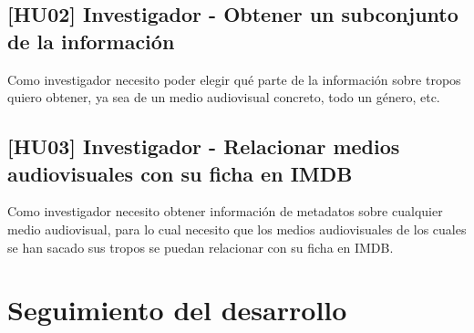 \subsection{[HU02] Investigador - Obtener un subconjunto de la información}
Como investigador necesito poder elegir qué parte de la información sobre tropos quiero obtener, ya sea de un medio audiovisual concreto, todo un género, etc.

\subsection{[HU03] Investigador - Relacionar medios audiovisuales con su ficha en IMDB}
Como investigador necesito obtener información de metadatos sobre cualquier medio audiovisual, para lo cual necesito que los medios audiovisuales de los cuales se han sacado sus tropos se puedan relacionar con su ficha en IMDB.

\section{Seguimiento del desarrollo}
